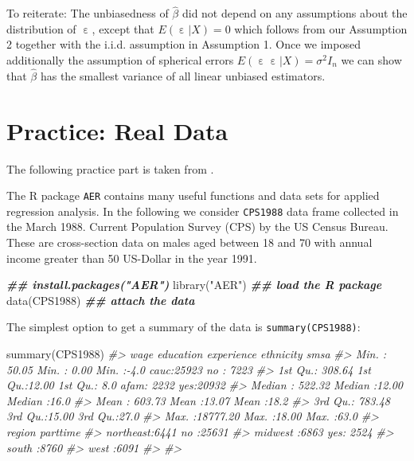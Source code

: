 \documentclass[
  14pt,
]{memoir}
\newenvironment{Shaded}{\begin{snugshade}}{\end{snugshade}}
\newcommand{\CommentTok}[1]{\textcolor[rgb]{0.56,0.35,0.01}{\textit{#1}}}
\newcommand{\DocumentationTok}[1]{\textcolor[rgb]{0.56,0.35,0.01}{\textbf{\textit{#1}}}}
\newcommand{\FunctionTok}[1]{\textcolor[rgb]{0.00,0.00,0.00}{#1}}
\newcommand{\NormalTok}[1]{#1}
\newcommand{\StringTok}[1]{\textcolor[rgb]{0.31,0.60,0.02}{#1}}
\DeclareMathOperator{\eps}{\varepsilon}
\begin{document}
To reiterate: The unbiasedness of \(\hat{\beta}\) did not depend on any assumptions about the distribution of \(\eps\), except that \(E(\eps|X)=0\) which follows from our Assumption 2 together with the i.i.d. assumption in Assumption 1. Once we imposed additionally the assumption of spherical errors \(E(\eps\eps|X)=\sigma^{2}I_n\) we can show that \(\hat{\beta}\) has the smallest variance of all linear unbiased estimators.

\hypertarget{practice-real-data}{%
\section{Practice: Real Data}\label{practice-real-data}}

The following practice part is taken from \cite{kleiber2008}.

The \textsf{R} package \texttt{AER} contains many useful functions and data sets for applied regression analysis. In the following we consider \texttt{CPS1988} data frame collected in the March 1988.
Current Population Survey (CPS) by the US Census Bureau. These are cross-section data on males aged between 18 and 70 with annual income greater than 50 US-Dollar in the year 1991.

\begin{Shaded}
\begin{Highlighting}[]
\DocumentationTok{\#\# install.packages("AER")}
\FunctionTok{library}\NormalTok{(}\StringTok{"AER"}\NormalTok{) }\DocumentationTok{\#\# load the R package}
\FunctionTok{data}\NormalTok{(CPS1988)  }\DocumentationTok{\#\# attach the data}
\end{Highlighting}
\end{Shaded}

The simplest option to get a summary of the data is \texttt{summary(CPS1988)}:

\begin{Shaded}
\begin{Highlighting}[]
\FunctionTok{summary}\NormalTok{(CPS1988)}
\CommentTok{\#\textgreater{}       wage            education       experience   ethnicity     smsa      }
\CommentTok{\#\textgreater{}  Min.   :   50.05   Min.   : 0.00   Min.   :{-}4.0   cauc:25923   no : 7223  }
\CommentTok{\#\textgreater{}  1st Qu.:  308.64   1st Qu.:12.00   1st Qu.: 8.0   afam: 2232   yes:20932  }
\CommentTok{\#\textgreater{}  Median :  522.32   Median :12.00   Median :16.0                           }
\CommentTok{\#\textgreater{}  Mean   :  603.73   Mean   :13.07   Mean   :18.2                           }
\CommentTok{\#\textgreater{}  3rd Qu.:  783.48   3rd Qu.:15.00   3rd Qu.:27.0                           }
\CommentTok{\#\textgreater{}  Max.   :18777.20   Max.   :18.00   Max.   :63.0                           }
\CommentTok{\#\textgreater{}        region     parttime   }
\CommentTok{\#\textgreater{}  northeast:6441   no :25631  }
\CommentTok{\#\textgreater{}  midwest  :6863   yes: 2524  }
\CommentTok{\#\textgreater{}  south    :8760              }
\CommentTok{\#\textgreater{}  west     :6091              }
\CommentTok{\#\textgreater{}                              }
\CommentTok{\#\textgreater{} }
\end{Highlighting}
\end{Shaded}
\end{document}
